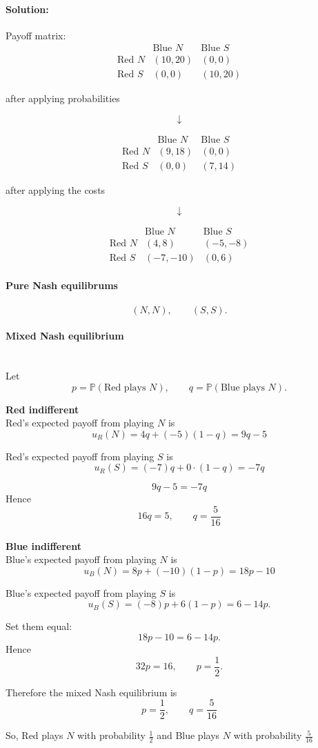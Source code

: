 \paragraph{Solution:}




Payoff matrix:
\[
\begin{array}{c|cc}
 & \text{Blue }N & \text{Blue }S\\
\hline
\text{Red }N & (10,20) & (0,0)\\
\text{Red }S & (0,0) & (10,20)
\end{array}
\]

\centerline{after applying probabilities}
\[\downarrow\]

\[
\begin{array}{c|cc}
 & \text{Blue }N & \text{Blue }S\\
\hline
\text{Red }N & (9,18) & (0,0)\\
\text{Red }S & (0,0) & (7,14)
\end{array}
\]

\centerline{after applying the costs}
\[\downarrow\]

\[
\begin{array}{c|cc}
 & \text{Blue }N & \text{Blue }S\\
\hline
\text{Red }N & (4,8) & (-5,-8)\\
\text{Red }S & (-7,-10) & (0,6)
\end{array}
\]

\paragraph{Pure Nash equilibrums}

\[
(N,N), \qquad (S,S).
\]

\paragraph{Mixed Nash equilibrium}\mbox{}\\
\noindent Let
\[
p=\mathbb{P}(\text{Red plays }N), \qquad
q=\mathbb{P}(\text{Blue plays }N).
\]


\textbf{Red indifferent}\\

\noindent Red's expected payoff from playing \(N\) is
\[
u_R(N)=4q+(-5)(1-q)=9q-5
\]

\noindent Red's expected payoff from playing \(S\) is
\[
u_R(S)=(-7)q+0\cdot(1-q)=-7q
\]

\[
9q-5=-7q
\]
Hence
\[
16q=5,
\qquad
q=\frac{5}{16}
\]\\


\textbf{Blue indifferent}\\

Blue's expected payoff from playing \(N\) is
\[
u_B(N)=8p+(-10)(1-p)=18p-10
\]

Blue's expected payoff from playing \(S\) is
\[
u_B(S)=(-8)p+6(1-p)=6-14p.
\]

Set them equal:
\[
18p-10=6-14p.
\]
Hence
\[
32p=16,
\qquad
p=\frac{1}{2}.
\]

Therefore the mixed Nash equilibrium is
\[
p=\frac{1}{2}, \qquad q=\frac{5}{16}
\]

So, Red plays \(N\) with probability \(\frac{1}{2}\) and Blue plays \(N\) with probability \(\frac{5}{16}\)
